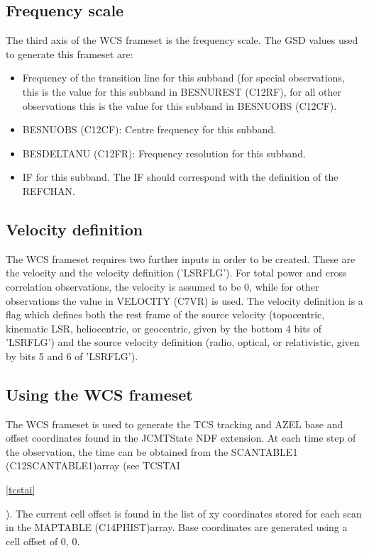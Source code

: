 \documentclass[twoside,11pt]{article}
\newcommand{\xlabel}[1]{}
\renewcommand{\_}{\texttt{\symbol{95}}}
\newcommand{\velocity}{VELOCITY (C7VR)}
\newcommand{\scanTableA}{SCAN\_TABLE1 (C12SCAN\_TABLE\_1)}
\newcommand{\mapTable}{MAP\_TABLE (C14PHIST)}
\newcommand{\centreFreqs}{BES\_NUOBS (C12CF)}
\newcommand{\restFreqs}{BES\_NUREST (C12RF)}
\newcommand{\freqRes}{BES\_DELTANU (C12FR)}
\newcommand{\velocity}{VELOCITY (C7VR)\ref{GSDVars:velocity}}
\newcommand{\scanTableA}{SCAN\_TABLE1 (C12SCAN\_TABLE\_1)\ref{GSDVars:scanTableA}}
\newcommand{\mapTable}{MAP\_TABLE (C14PHIST)\ref{GSDVars:mapTable}}
\newcommand{\centreFreqs}{BES\_NUOBS (C12CF)\ref{GSDVars:centreFreqs}}
\newcommand{\restFreqs}{BES\_NUREST (C12RF)\ref{GSDVars:restFreqs}}
\newcommand{\freqRes}{BES\_DELTANU (C12FR)\ref{GSDVars:freqRes}}
\begin{document}
\subsection{\xlabel{WCS_FREQUENCY}Frequency scale}

The third axis of the WCS frameset is the frequency scale.  The GSD values used to generate this frameset are:

\begin{itemize}
\item Frequency of the transition line for this subband (for special observations, this is the value for this subband in \restFreqs{}, for all other observations this is the value for this subband in \centreFreqs{}.
\item \centreFreqs{}: Centre frequency for this subband.
\item \freqRes{}: Frequency resolution for this subband.
\item IF for this subband.  The IF should correspond with the definition of the REFCHAN.
\end{itemize}

\subsection{\xlabel{WCS_VELOCITY}Velocity definition}

The WCS frameset requires two further inputs in order to be created.  These are the velocity and the velocity definition ('LSRFLG').  For total power and cross correlation observations, the velocity is assumed to be 0, while for other observations the value in \velocity{} is used.  The velocity definition is a flag which defines both the rest frame of the source velocity (topocentric, kinematic LSR, heliocentric, or geocentric, given by the bottom 4 bits of 'LSRFLG') and the source velocity definition (radio, optical, or relativistic, given by bits 5 and 6 of 'LSRFLG').

\subsection{\xlabel{WCS_USING}Using the WCS frameset}

The WCS frameset is used to generate the TCS tracking and AZEL base and offset coordinates found in the JCMTState NDF extension.
At each time step of the observation, the time can be obtained from the \scanTableA array (see TCS\_TAI
\begin{htmlonly}
\ref{tcstai}
\end{htmlonly}
).  The current cell offset is found in the list of xy coordinates stored for each scan in the \mapTable array.  Base coordinates are generated using a cell offset of 0, 0.
\end{document}
